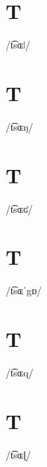 \documentclass[10pt,a4paper,twoside]{book}
\begin{document}
\section*{T}

\begin{multicols}{3}
 {/t͡sɶǀ/} {}
\end{multicols}

\section*{T}

\begin{multicols}{3}
 {/t͡sɶŋ/} {}
\end{multicols}

\section*{T}

\begin{multicols}{3}
 {/t͡sɶʛ/} {}
\end{multicols}

\section*{T}

\begin{multicols}{3}
 {/t͡sɶˈgɒ/} {}
\end{multicols}

\section*{T}

\begin{multicols}{3}
 {/t͡sɶq/} {}
\end{multicols}

\section*{T}

\begin{multicols}{3}
 {/t͡sɶɭ/} {}
\end{multicols}
\end{document}
